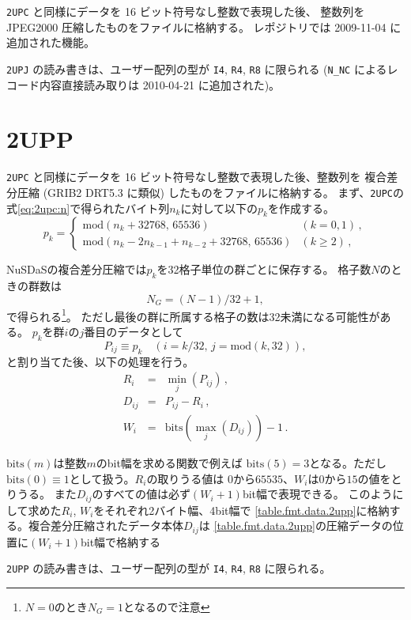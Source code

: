 {\tt 2UPC} と同様にデータを 16 ビット符号なし整数で表現した後、
整数列を JPEG2000 圧縮したものをファイルに格納する。
レポジトリでは 2009-11-04 に追加された機能。

{\tt 2UPJ} の読み書きは、ユーザー配列の型が {\tt I4},
{\tt R4}, {\tt R8} に限られる
({\tt N\_NC} によるレコード内容直接読み取りは 2010-04-21 に追加された)。

\section{2UPP}

{\tt 2UPC} と同様にデータを 16 ビット符号なし整数で表現した後、整数列を
複合差分圧縮 (GRIB2 DRT5.3 に類似) したものをファイルに格納する。
まず、{\tt 2UPC}の式\ref{eq:2upc:n}で得られたバイト列$n_k$に対して以下の$p_k$を作成する。
\begin{equation}
  p_k = \left\{ \begin{array}{ll}
    \mathrm{mod}\left(n_k + 32768, \, 
      65536\right) & (k = 0, 1) \,, \\
    \mathrm{mod}\left(n_{k} - 2n_{k-1} + n_{k-2} + 32768, \,
      65536\right) & (k \geq 2) \,,
  \end{array} \right.
\end{equation}

NuSDaSの複合差分圧縮では$p_k$を32格子単位の群ごとに保存する。
格子数$N$のときの群数は
\begin{equation}
N_G = (N - 1) / 32 + 1,
\end{equation}
で得られる\footnote{$N=0$のとき$N_G=1$となるので注意}。
ただし最後の群に所属する格子の数は32未満になる可能性がある。
$p_k$を群$i$の$j$番目のデータとして
\begin{equation}
P_{ij} \equiv p_k \quad \left(i=k/32,\,j=\mathrm{mod}\left(k,32\right) \right),
\end{equation}
と割り当てた後、以下の処理を行う。
\begin{eqnarray}
R_i &=& \min_j \left(P_{ij}\right) \,, \\
D_{ij} &=& P_{ij} - R_i \,, \\
W_i &=& \mathrm{bits}\left(\max_j\left(D_{ij}\right)\right) - 1 \,.
\end{eqnarray}

$\mathrm{bits}(m)$は整数$m$のbit幅を求める関数で例えば
$\mathrm{bits}(5) = 3$となる。ただし
$\mathrm{bits}(0) \equiv 1$として扱う。$R_i$の取りうる値は
$0$から$65535$、$W_i$は$0$から$15$の値をとりうる。
また$D_{ij}$のすべての値は必ず$(W_i+1)$bit幅で表現できる。
このようにして求めた$R_i$, $W_i$をそれぞれ2バイト幅、4bit幅で
\ref{table.fmt.data.2upp}に格納する。複合差分圧縮されたデータ本体$D_{ij}$は
\ref{table.fmt.data.2upp}の圧縮データの位置に$(W_i + 1)$bit幅で格納する

{\tt 2UPP} の読み書きは、ユーザー配列の型が {\tt I4},
{\tt R4}, {\tt R8} に限られる。
